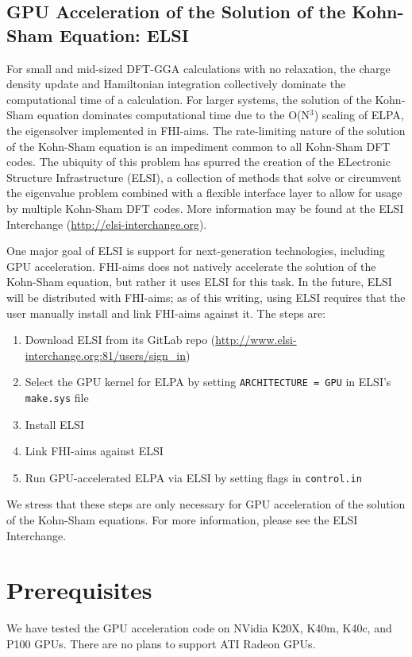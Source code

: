 \subsection{GPU Acceleration of the Solution of the Kohn-Sham Equation: ELSI}
For small and mid-sized DFT-GGA calculations with no relaxation, the charge density update and Hamiltonian integration collectively dominate the computational time of a calculation.  For larger systems, the solution of the Kohn-Sham equation dominates computational time due to the O(N$^3$) scaling of ELPA, the eigensolver implemented in FHI-aims.  The rate-limiting nature of the solution of the Kohn-Sham equation is an impediment common to all Kohn-Sham DFT codes.  The ubiquity of this problem has spurred the creation of the ELectronic Structure Infrastructure (ELSI), a collection of methods that solve or circumvent the eigenvalue problem combined with a flexible interface layer to allow for usage by multiple Kohn-Sham DFT codes.   More information may be found at the ELSI Interchange (\url{http://elsi-interchange.org}).

One major goal of ELSI is support for next-generation technologies, including GPU acceleration.  FHI-aims does not natively accelerate the solution of the Kohn-Sham equation, but rather it uses ELSI for this task.  In the future, ELSI will be distributed with FHI-aims; as of this writing, using ELSI requires that the user manually install and link FHI-aims against it.  The steps are:
\begin{enumerate}
	\item Download ELSI from its GitLab repo (\url{http://www.elsi-interchange.org:81/users/sign_in})
	\item Select the GPU kernel for ELPA by setting \texttt{ARCHITECTURE = GPU} in ELSI's \texttt{make.sys} file
	\item Install ELSI
	\item Link FHI-aims against ELSI 
	\item Run GPU-accelerated ELPA via ELSI by setting flags in \texttt{control.in}
\end{enumerate}
We stress that these steps are only necessary for GPU acceleration of the solution of the Kohn-Sham equations.  For more information, please see the ELSI Interchange.

\section{Prerequisites}
We have tested the GPU acceleration code on NVidia K20X, K40m, K40c, and P100 GPUs.  There are no plans to support ATI Radeon GPUs.

